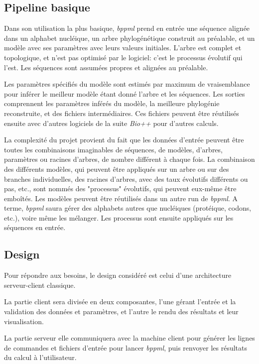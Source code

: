 \subsection{Pipeline basique}

Dans son utilisation la plus basique,
\textit{bppml} prend en entrée une séquence alignée dans un alphabet nucléique,
un arbre phylogénétique construit au préalable,
et un modèle avec ses paramètres
avec leurs valeurs initiales.
L'arbre est complet et topologique,
et n'est pas optimisé par le logiciel:
c'est le processus évolutif qui l'est.
Les séquences sont assumées propres et alignées au préalable.

Les paramètres spécifiés du modèle sont estimés par maximum de vraisemblance
pour inférer le meilleur modèle étant donné l'arbre et les séquences.
Les sorties comprennent les paramètres inférés du modèle,
la meilleure phylogénie reconstruite,
et des fichiers intermédiaires.
Ces fichiers peuvent être réutilisés ensuite
avec d'autres logiciels de la suite \textit{Bio++}
pour d'autres calculs.

La complexité du projet provient du fait que les données d'entrée
peuvent être toutes les combinaisons imaginables
de séquences, de modèles, d'arbres, paramètres ou racines d'arbres,
de nombre différent à chaque fois.
La combinaison des différents modèles,
qui peuvent être appliqués sur un arbre ou sur des branches individuelles,
des racines d'arbres,
avec des taux évolutifs différents ou pas, etc.,
sont nommés des "processus" évolutifs,
qui peuvent eux-même être emboîtés.
Les modèles peuvent être réutilisés
dans un autre run de \textit{bppml}.
A terme, \textit{bppml} saura gérer des alphabets autres que nucléiques
(protéique, codons, etc.),
voire même les mélanger.
Les processus sont ensuite appliqués sur les séquences en entrée.


\subsection{Design}

Pour répondre aux besoins,
le design considéré est celui d'une architecture serveur-client classique.

La partie client sera divisée en deux composantes,
l'une gérant l'entrée et la validation des données et paramètres,
et l'autre le rendu des résultats et leur visualisation.

La partie serveur elle communiquera avec la machine client
pour générer les lignes de commandes et fichiers d'entrée
pour lancer \textit{bppml},
puis renvoyer les résultats du calcul à l'utilisateur.

